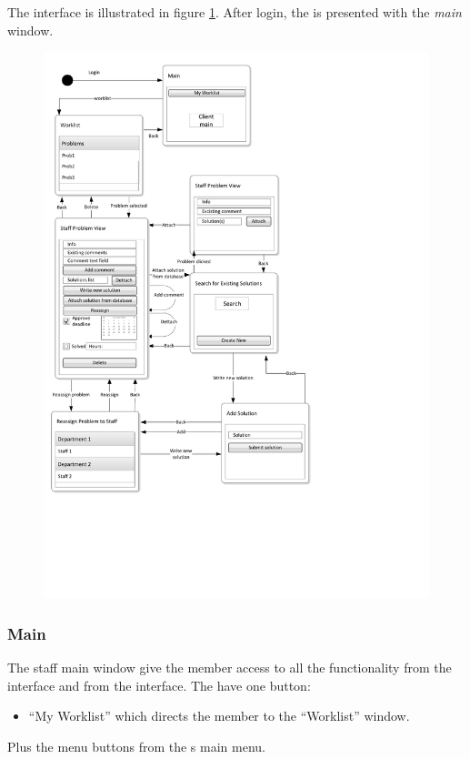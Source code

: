 
\subsection{\sinterface}
The \astaff[] interface is illustrated in figure \ref{fig:staff_interface}.
After login, the \astaff[] is presented with the \textit{main} window. 

\begin{figure}[p]
	\centering
		\includegraphics[width = \textwidth, clip=true, trim=0 4cm 5cm 0]{input/application_domain_analysis/Navigation_DiagramStaff.pdf}
	\label{fig:staff_interface} %
\end{figure}

\subsubsection{Main}
The staff main window give the \astaff[] member access to all the functionality from the \astaff[] interface and from the \aclient[] interface. The \astaff[] have one button:
\begin{itemize}
	\item ``My Worklist'' which directs the \astaff[] member to the ``Worklist'' window. 
\end{itemize}   
Plus the menu buttons from the \aclient[]s main menu.

